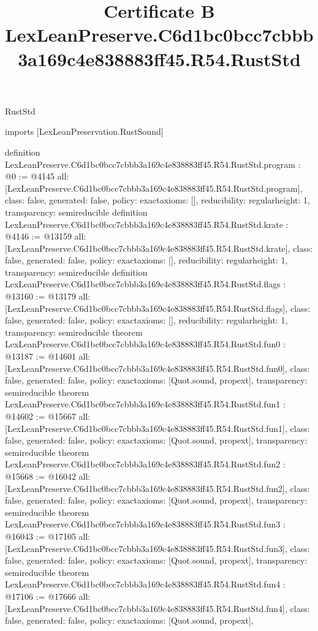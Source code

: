 \begin{lexlean}{RustStd}
\title{Certificate B LexLeanPreserve.C6d1bc0bcc7cbbb3a169c4e838883ff45.R54.RustStd}
\begin{coremodule}
imports [LexLeanPreservation.RustSound]

definition LexLeanPreserve.C6d1bc0bcc7cbbb3a169c4e838883ff45.R54.RustStd.program : @0 := @4145 {
  all: [LexLeanPreserve.C6d1bc0bcc7cbbb3a169c4e838883ff45.R54.RustStd.program],
  class: false,
  generated: false,
  policy: exact{axioms: []},
  reducibility: regular{height: 1},
  transparency: semireducible
}
definition LexLeanPreserve.C6d1bc0bcc7cbbb3a169c4e838883ff45.R54.RustStd.krate : @4146 := @13159 {
  all: [LexLeanPreserve.C6d1bc0bcc7cbbb3a169c4e838883ff45.R54.RustStd.krate],
  class: false,
  generated: false,
  policy: exact{axioms: []},
  reducibility: regular{height: 1},
  transparency: semireducible
}
definition LexLeanPreserve.C6d1bc0bcc7cbbb3a169c4e838883ff45.R54.RustStd.flags : @13160 := @13179 {
  all: [LexLeanPreserve.C6d1bc0bcc7cbbb3a169c4e838883ff45.R54.RustStd.flags],
  class: false,
  generated: false,
  policy: exact{axioms: []},
  reducibility: regular{height: 1},
  transparency: semireducible
}
theorem LexLeanPreserve.C6d1bc0bcc7cbbb3a169c4e838883ff45.R54.RustStd.fun0 : @13187 := @14601 {
  all: [LexLeanPreserve.C6d1bc0bcc7cbbb3a169c4e838883ff45.R54.RustStd.fun0],
  class: false,
  generated: false,
  policy: exact{axioms: [Quot.sound, propext]},
  transparency: semireducible
}
theorem LexLeanPreserve.C6d1bc0bcc7cbbb3a169c4e838883ff45.R54.RustStd.fun1 : @14602 := @15667 {
  all: [LexLeanPreserve.C6d1bc0bcc7cbbb3a169c4e838883ff45.R54.RustStd.fun1],
  class: false,
  generated: false,
  policy: exact{axioms: [Quot.sound, propext]},
  transparency: semireducible
}
theorem LexLeanPreserve.C6d1bc0bcc7cbbb3a169c4e838883ff45.R54.RustStd.fun2 : @15668 := @16042 {
  all: [LexLeanPreserve.C6d1bc0bcc7cbbb3a169c4e838883ff45.R54.RustStd.fun2],
  class: false,
  generated: false,
  policy: exact{axioms: [Quot.sound, propext]},
  transparency: semireducible
}
theorem LexLeanPreserve.C6d1bc0bcc7cbbb3a169c4e838883ff45.R54.RustStd.fun3 : @16043 := @17105 {
  all: [LexLeanPreserve.C6d1bc0bcc7cbbb3a169c4e838883ff45.R54.RustStd.fun3],
  class: false,
  generated: false,
  policy: exact{axioms: [Quot.sound, propext]},
  transparency: semireducible
}
theorem LexLeanPreserve.C6d1bc0bcc7cbbb3a169c4e838883ff45.R54.RustStd.fun4 : @17106 := @17666 {
  all: [LexLeanPreserve.C6d1bc0bcc7cbbb3a169c4e838883ff45.R54.RustStd.fun4],
  class: false,
  generated: false,
  policy: exact{axioms: [Quot.sound, propext]},
}
\end{coremodule}
\end{lexlean}
